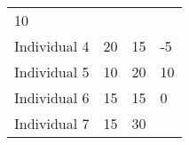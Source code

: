 \documentclass[]{article}
\begin{document}
\begin{longtable}[]{@{}llll@{}}
\begin{minipage}[t]{0.16\columnwidth}
10\strut
\end{minipage}\tabularnewline
\begin{minipage}[t]{0.20\columnwidth}\raggedright\strut
Individual 4\strut
\end{minipage} & \begin{minipage}[t]{0.16\columnwidth}\raggedright\strut
20\strut
\end{minipage} & \begin{minipage}[t]{0.16\columnwidth}\raggedright\strut
15\strut
\end{minipage} & \begin{minipage}[t]{0.16\columnwidth}\raggedright\strut
-5\strut
\end{minipage}\tabularnewline
\begin{minipage}[t]{0.20\columnwidth}\raggedright\strut
Individual 5\strut
\end{minipage} & \begin{minipage}[t]{0.16\columnwidth}\raggedright\strut
10\strut
\end{minipage} & \begin{minipage}[t]{0.16\columnwidth}\raggedright\strut
20\strut
\end{minipage} & \begin{minipage}[t]{0.16\columnwidth}\raggedright\strut
10\strut
\end{minipage}\tabularnewline
\begin{minipage}[t]{0.20\columnwidth}\raggedright\strut
Individual 6\strut
\end{minipage} & \begin{minipage}[t]{0.16\columnwidth}\raggedright\strut
15\strut
\end{minipage} & \begin{minipage}[t]{0.16\columnwidth}\raggedright\strut
15\strut
\end{minipage} & \begin{minipage}[t]{0.16\columnwidth}\raggedright\strut
0\strut
\end{minipage}\tabularnewline
\begin{minipage}[t]{0.20\columnwidth}\raggedright\strut
Individual 7\strut
\end{minipage} & \begin{minipage}[t]{0.16\columnwidth}\raggedright\strut
15\strut
\end{minipage} & \begin{minipage}[t]{0.16\columnwidth}\raggedright\strut
30\strut
\end{minipage} & \begin{minipage}[t]{0.16\columnwidth}\raggedright\strut

\end{minipage}
\end{longtable}
\end{document}
